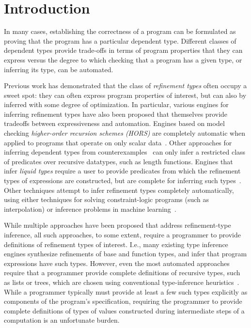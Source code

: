 \section{Introduction}
\label{s:intro}
%
In many cases, establishing the correctness of a program can be
formulated as proving that the program has a particular dependent
type.
%
Different classes of dependent types provide trade-offs in terms of
program properties that they can express versus the degree to which
checking that a program has a given type, or inferring its type, can
be automated.

Previous work has demonstrated that the class of \emph{refinement
  types} often occupy a sweet spot: they can often express program
properties of interest, but can also by inferred with some degree of
optimization.
%
In particular, various engines for inferring refinement types have
also been proposed that themselves provide tradeoffs between
expressiveness and automation.
Engines based on model checking \emph{higher-order recursion schemes
  (HORS)} are completely automatic when applied to programs that
operate on only scalar data~\cite{kobayashi09}.
%
Other approaches for inferring dependent types from
counterexamples~\cite{kobayashi11} can only infer a restricted class
of predicates over recursive datatypes, such as length functions.
Engines that infer \emph{liquid types} require a user to provide
predicates from which the refinement types of expressions are
constructed, but are complete for inferring such
types~\cite{kawaguchi09,rondon08,vazou14}.
Other techniques attempt to infer refinement types completely
automatically, using either techniques for solving constraint-logic
programs (such as interpolation) or inference problems in machine
learning~\cite{terauchi10}.

While multiple approaches have been proposed that address
refinement-type inference, all such approaches, to some extent,
require a programmer to provide definitions of refinement types of
interest.
%
I.e., many existing type inference engines synthesize refinements of
base and function types, and infer that program expressions have such
types.
%
However, even the most automated approaches~\cite{unno09} require that
a programmer provide complete definitions of recursive types, such as
lists or trees, which are chosen using conventional type-inference
heuristics~\cite{pierce98}.
%
While a programmer typically must provide at least a few such types
explicitly as components of the program's specification, requiring the
programmer to provide complete definitions of types of values
constructed during intermediate steps of a computation is an
unfortunate burden.

